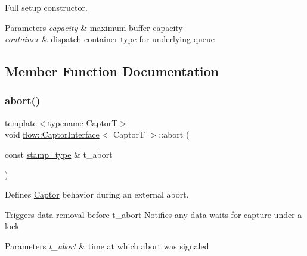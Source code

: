 Full setup constructor. 


\begin{DoxyParams}{Parameters}
{\em capacity} & maximum buffer capacity \\
\hline
{\em container} & dispatch container type for underlying queue \\
\hline
\end{DoxyParams}


\subsection{Member Function Documentation}
\mbox{\label{classflow_1_1_captor_interface_a313e147c9159cf2faf7b131bac8f4b54}} 
\subsubsection{\texorpdfstring{abort()}{abort()}}
{\footnotesize\ttfamily template$<$typename CaptorT$>$ \\
void \hyperlink{classflow_1_1_captor_interface}{flow\+::\+Captor\+Interface}$<$ CaptorT $>$\+::abort (\begin{DoxyParamCaption}\item[{const \hyperlink{classflow_1_1_captor_interface_a2b87d20d17e8d1437941bd98fe514bc8}{stamp\+\_\+type} \&}]{t\+\_\+abort }\end{DoxyParamCaption})\hspace{0.3cm}{\ttfamily [inline]}}



Defines \hyperlink{classflow_1_1_captor}{Captor} behavior during an external abort. 

Triggers data removal before {\ttfamily t\+\_\+abort} Notifies any data waits for capture under a lock


\begin{DoxyParams}{Parameters}
{\em t\+\_\+abort} & time at which abort was signaled \\
\hline
\end{DoxyParams}
\mbox{\label{classflow_1_1_captor_interface_ae95095d924214605bfeac70d0bd5ad35}} 
